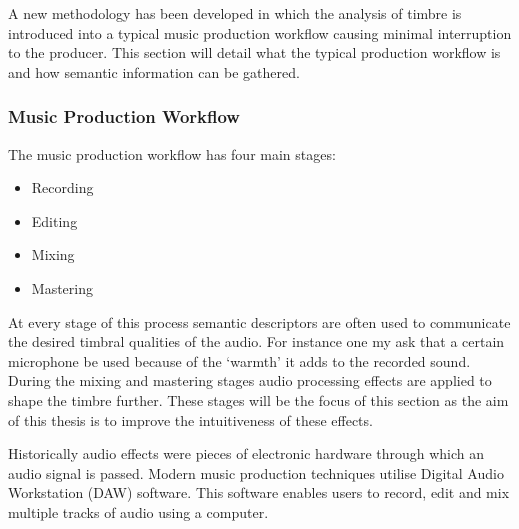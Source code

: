 	A new methodology has been developed in which the analysis of timbre is introduced into a typical music production
	workflow causing minimal interruption to the producer. This section will detail what the typical production workflow
	is and how semantic information can be gathered.

\subsubsection{Music Production Workflow}
\label{sec:Music-Production-Workflow}

	The music production workflow has four main stages:

	\begin{itemize}
		\item Recording
		\item Editing
		\item Mixing
		\item Mastering
	\end{itemize}

	At every stage of this process semantic descriptors are often used to communicate the desired timbral qualities of
	the audio. For instance one my ask that a certain microphone be used because of the `warmth' it adds to the recorded
	sound. During the mixing and mastering stages audio processing effects are applied to shape the timbre further.
	These stages will be the focus of this section as the aim of this thesis is to improve the intuitiveness of these
	effects.

	Historically audio effects were pieces of electronic hardware through which an audio signal is passed. Modern music
	production techniques utilise Digital Audio Workstation (DAW) software. This software enables users to record, edit
	and mix multiple tracks of audio using a computer. 
